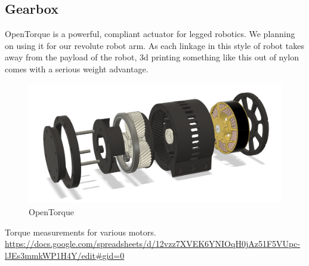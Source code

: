 \documentclass[12pt,journal,compsoc]{IEEEtran}
\begin{document}
\subsection{Gearbox}
OpenTorque is a powerful, compliant actuator for legged robotics. We planning on using it for our revolute robot arm. As each linkage in this style of robot takes away from the payload of the robot, 3d printing something like this out of nylon comes with a serious weight advantage.

\begin{figure}[H]
\centering
\caption{OpenTorque}
\includegraphics[scale=0.15]{images/openTorque.png}
\end{figure}

\begin{thebibliography}{1}
Torque measurements for various motors. 
\url{https://docs.google.com/spreadsheets/d/12vzz7XVEK6YNIOqH0jAz51F5VUpc-lJEs3mmkWP1H4Y/edit#gid=0}

\end{thebibliography}
\end{document}
